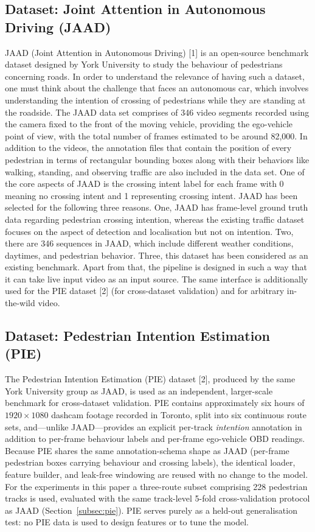 \documentclass[conference]{IEEEtran}
\begin{document}
\subsection{Dataset: Joint Attention in Autonomous Driving (JAAD)}
JAAD (Joint Attention in Autonomous Driving) [1] is an open-source benchmark dataset designed by York University to study the behaviour of pedestrians concerning roads. In order to understand the relevance of having such a dataset, one must think about the challenge that faces an autonomous car, which involves understanding the intention of crossing of pedestrians while they are standing at the roadside.
The JAAD data set comprises of 346 video segments recorded using the camera fixed to the front of the moving vehicle, providing the ego-vehicle point of view, with the total number of frames estimated to be around 82{,}000. In addition to the videos, the annotation files that contain the position of every pedestrian in terms of rectangular bounding boxes along with their behaviors like walking, standing, and observing traffic are also included in the data set. One of the core aspects of JAAD is the crossing intent label for each frame with 0 meaning no crossing intent and 1 representing crossing intent.
JAAD has been selected for the following three reasons. One, JAAD has frame-level ground truth data regarding pedestrian crossing intention, whereas the existing traffic dataset focuses on the aspect of detection and localisation but not on intention. Two, there are 346 sequences in JAAD, which include different weather conditions, daytimes, and pedestrian behavior. Three, this dataset has been considered as an existing benchmark. Apart from that, the pipeline is designed in such a way that it can take live input video as an input source. The same interface is additionally used for the PIE dataset [2] (for cross-dataset validation) and for arbitrary in-the-wild video.

\subsection{Dataset: Pedestrian Intention Estimation (PIE)}
The Pedestrian Intention Estimation (PIE) dataset [2], produced by the same York University group as JAAD, is used as an independent, larger-scale benchmark for cross-dataset validation. PIE contains approximately six hours of $1920\times1080$ dashcam footage recorded in Toronto, split into six continuous route sets, and---unlike JAAD---provides an explicit per-track \emph{intention} annotation in addition to per-frame behaviour labels and per-frame ego-vehicle OBD readings. Because PIE shares the same annotation-schema shape as JAAD (per-frame pedestrian boxes carrying behaviour and crossing labels), the identical loader, feature builder, and leak-free windowing are reused with no change to the model. For the experiments in this paper a three-route subset comprising 228 pedestrian tracks is used, evaluated with the same track-level 5-fold cross-validation protocol as JAAD (Section~\ref{subsec:pie}). PIE serves purely as a held-out generalisation test: no PIE data is used to design features or to tune the model.
\end{document}

